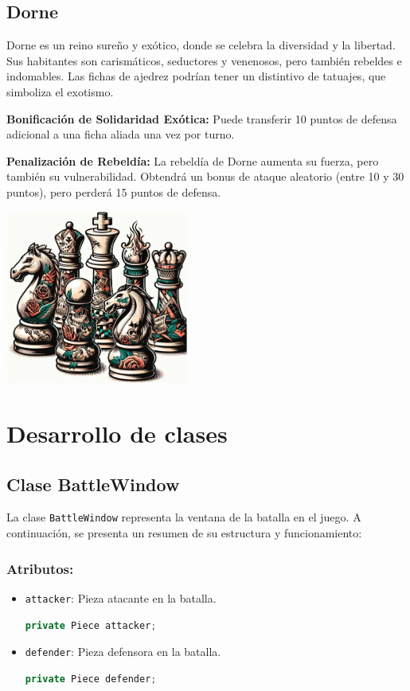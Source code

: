 \documentclass{article}
\begin{document}
\subsection{Dorne}
Dorne es un reino sureño y exótico, donde se celebra la diversidad y la libertad. Sus habitantes son carismáticos, seductores y venenosos, pero también rebeldes e indomables. Las fichas de ajedrez podrían tener un distintivo de tatuajes, que simboliza el exotismo.

\textbf{Bonificación de Solidaridad Exótica:}
Puede transferir 10 puntos de defensa adicional a una ficha aliada una vez por turno.

\textbf{Penalización de Rebeldía:}
La rebeldía de Dorne aumenta su fuerza, pero también su vulnerabilidad. Obtendrá un bonus de ataque aleatorio (entre 10 y 30 puntos), pero perderá 15 puntos de defensa.
\begin{center}
    \includegraphics[width=6cm]{latex/img/Dorne.png}
\end{center}

\section{Desarrollo de clases}

\subsection{Clase BattleWindow}
La clase \texttt{BattleWindow} representa la ventana de la batalla en el juego. A continuación, se presenta un resumen de su estructura y funcionamiento:

\subsubsection{Atributos:}
\begin{itemize}
  \item \texttt{attacker}: Pieza atacante en la batalla.
  \begin{lstlisting}[language=java,caption={Atributo \texttt{attacker} en la clase \texttt{BattleWindow}}]
    private Piece attacker;
  \end{lstlisting}

  \item \texttt{defender}: Pieza defensora en la batalla.
  \begin{lstlisting}[language=java,caption={Atributo \texttt{defender} en la clase \texttt{BattleWindow}}]
    private Piece defender;
  \end{lstlisting}
\end{itemize}
\end{document}
